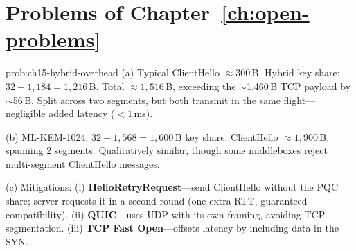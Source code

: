 \section*{Problems of Chapter~\ref{ch:open-problems}}

\begin{sol}{prob:ch15-hybrid-overhead}
(a) Typical ClientHello $\approx 300$\,B.  Hybrid key share: $32+1{,}184=1{,}216$\,B.  Total $\approx 1{,}516$\,B, exceeding the $\sim$1,460\,B TCP payload by $\sim$56\,B.  Split across two segments, but both transmit in the same flight---negligible added latency ($<1$\,ms).

(b) ML-KEM-1024: $32+1{,}568=1{,}600$\,B key share.  ClientHello $\approx 1{,}900$\,B, spanning 2 segments.  Qualitatively similar, though some middleboxes reject multi-segment ClientHello messages.

(c) Mitigations: (i) \textbf{HelloRetryRequest}---send ClientHello without the PQC share; server requests it in a second round (one extra RTT, guaranteed compatibility).  (ii) \textbf{QUIC}---uses UDP with its own framing, avoiding TCP segmentation.  (iii) \textbf{TCP Fast Open}---offsets latency by including data in the SYN.
\end{sol}
